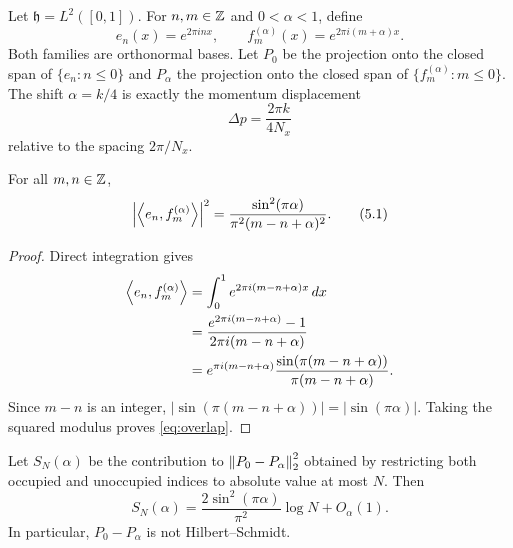 Let $\mathfrak h=L^2([0,1])$.  For $n,m\in\mathbb Z$ and
$0<\alpha<1$, define
\[
 e_n(x)=e^{2\pi inx},\qquad
 f_m^{(\alpha)}(x)=e^{2\pi i(m+\alpha)x}.
\]
Both families are orthonormal bases.  Let $P_0$ be the projection onto
the closed span of $\{e_n:n\le0\}$ and $P_\alpha$ the projection onto
the closed span of $\{f_m^{(\alpha)}:m\le0\}$.  The shift
$\alpha=k/4$ is exactly the momentum displacement
\[
 \Delta p=\frac{2\pi k}{4N_x}
\]
relative to the spacing $2\pi/N_x$.

\begin{lemma}\label{lem:overlap}
For all $m,n\in\mathbb Z$,
\[
 \left|\left\langle e_n,f_m^{(\alpha)}\right\rangle\right|^2
 =\frac{\sin^2(\pi\alpha)}
 {\pi^2(m-n+\alpha)^2}.
\tag{5.1}\label{eq:overlap}
\]
\end{lemma}

\begin{proof}
Direct integration gives
\[
\begin{aligned}
\left\langle e_n,f_m^{(\alpha)}\right\rangle
&=\int_0^1e^{2\pi i(m-n+\alpha)x}\,dx\\
&=\frac{e^{2\pi i(m-n+\alpha)}-1}
 {2\pi i(m-n+\alpha)}\\
&=e^{\pi i(m-n+\alpha)}
\frac{\sin(\pi(m-n+\alpha))}
 {\pi(m-n+\alpha)}.
\end{aligned}
\]
Since $m-n$ is an integer,
$|\sin(\pi(m-n+\alpha))|=|\sin(\pi\alpha)|$.
Taking the squared modulus proves \eqref{eq:overlap}.
\end{proof}

\begin{theorem}
\label{thm:oneedge}
Let $S_N(\alpha)$ be the contribution to
$\left\lVert P_0-P_\alpha\right\rVert_2^2$ obtained by restricting both occupied and
unoccupied indices to absolute value at most $N$.  Then
\[
 S_N(\alpha)
 =\frac{2\sin^2(\pi\alpha)}{\pi^2}\log N+O_\alpha(1).
\tag{5.2}\label{eq:one-edge-log}
\]
In particular, $P_0-P_\alpha$ is not Hilbert--Schmidt.
\end{theorem}

